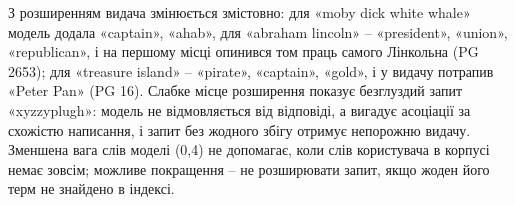 З розширенням видача змінюється змістовно: для «moby dick white whale» модель додала
«captain», «ahab», для «abraham lincoln» -- «president», «union», «republican», і на першому
місці опинився том праць самого Лінкольна (PG 2653); для «treasure island» -- «pirate»,
«captain», «gold», і у видачу потрапив «Peter Pan» (PG 16). Слабке місце розширення
показує безглуздий запит «xyzzyplugh»: модель не відмовляється від відповіді, а вигадує
асоціації за схожістю написання, і запит без жодного збігу отримує непорожню видачу.
Зменшена вага слів моделі (0,4) не допомагає, коли слів користувача в корпусі немає зовсім;
можливе покращення -- не розширювати запит, якщо жоден його терм не знайдено в індексі.
